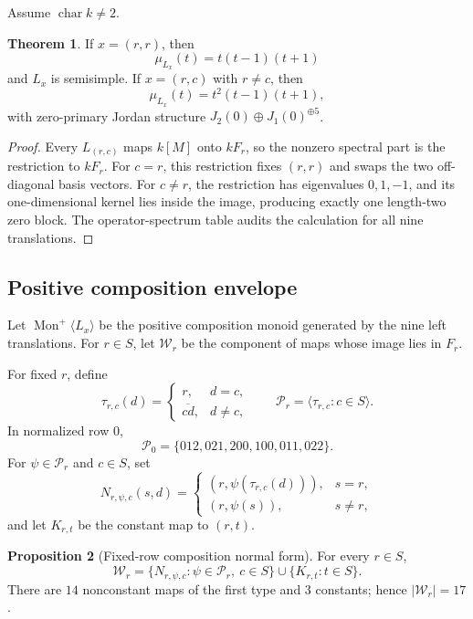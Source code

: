 \documentclass[11pt]{article}
\theoremstyle{definition}
\newtheorem{theorem}{Theorem}[section]
\newtheorem{proposition}[theorem]{Proposition}
\begin{document}
Assume \(\operatorname{char}k\ne2\).

\begin{theorem}
\label{thm:14.3}
If \(x=(r,r)\), then
\[
\mu_{L_x}(t)=t(t-1)(t+1)
\]
and \(L_x\) is semisimple.  If \(x=(r,c)\) with \(r\ne c\), then
\[
\mu_{L_x}(t)=t^2(t-1)(t+1),
\]
with zero-primary Jordan structure \(J_2(0)\oplus J_1(0)^{\oplus5}\).
\end{theorem}

\begin{proof}
Every \(L_{(r,c)}\) maps \(k[M]\) onto \(kF_r\), so the nonzero spectral
part is the restriction to \(kF_r\).  For \(c=r\), this restriction fixes
\((r,r)\) and swaps the two off-diagonal basis vectors.  For \(c\ne r\),
the restriction has eigenvalues \(0,1,-1\), and its one-dimensional kernel
lies inside the image, producing exactly one length-two zero block.  The
operator-spectrum table audits the calculation for all nine translations.
\end{proof}

\subsection{Positive composition envelope}\label{composition-envelope-and-directed-edge-representation}

Let \(\operatorname{Mon}^+\langle L_x\rangle\) be the positive composition
monoid generated by the nine left translations.  For \(r\in S\), let
\(\mathcal W_r\) be the component of maps whose image lies in \(F_r\).

For fixed \(r\), define
\[
\tau_{r,c}(d)=
\begin{cases}
r, & d=c,\\
\overline{cd}, & d\ne c,
\end{cases}
\qquad
\mathcal P_r=\langle \tau_{r,c}:c\in S\rangle.
\]
In normalized row \(0\),
\[
\mathcal P_0=\{012,021,200,100,011,022\}.
\]
For \(\psi\in\mathcal P_r\) and \(c\in S\), set
\[
N_{r,\psi,c}(s,d)=
\begin{cases}
(r,\psi(\tau_{r,c}(d))), & s=r,\\
(r,\psi(s)), & s\ne r,
\end{cases}
\]
and let \(K_{r,t}\) be the constant map to \((r,t)\).

\begin{proposition}[Fixed-row composition normal form]
\label{prop:15.1}
For every \(r\in S\),
\[
\mathcal W_r=
\{N_{r,\psi,c}:\psi\in\mathcal P_r,\ c\in S\}
\cup
\{K_{r,t}:t\in S\}.
\]
There are \(14\) nonconstant maps of the first type and \(3\) constants;
hence \(|\mathcal W_r|=17\).
\end{proposition}
\end{document}
